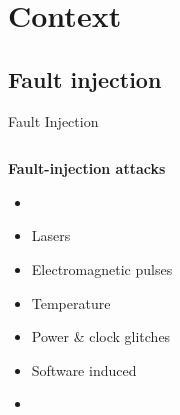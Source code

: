 \section{Context}
\subsection{Fault injection}

\begin{frame}[fragile]{Fault Injection}
\vfill
{
\small
\begin{columns}
    \begin{column}{0.4\textwidth}
     
        \vfill
        \textbf{Fault-injection attacks} %
        \begin{itemize}
            \item[]
            \item Lasers%
            \item Electromagnetic pulses %
            \item Temperature %
            \item Power \& clock glitches%
            \item Software induced %
            \item[]
        \end{itemize}
    

\end{column}
\end{columns}}
\end{frame}
